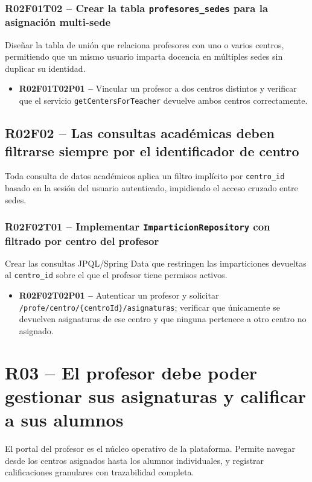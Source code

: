 \documentclass[12pt, a4paper]{report}
\begin{document}
\subsubsection{R02F01T02 -- Crear la tabla \texttt{profesores\_sedes} para la asignación multi-sede}
Diseñar la tabla de unión que relaciona profesores con uno o varios centros, permitiendo que un mismo usuario imparta docencia en múltiples sedes sin duplicar su identidad.
\begin{itemize}
  \item \textbf{R02F01T02P01 --} Vincular un profesor a dos centros distintos y verificar que el servicio \texttt{getCentersForTeacher} devuelve ambos centros correctamente.
\end{itemize}

\subsection{R02F02 -- Las consultas académicas deben filtrarse siempre por el identificador de centro}

Toda consulta de datos académicos aplica un filtro implícito por \texttt{centro\_id} basado en la sesión del usuario autenticado, impidiendo el acceso cruzado entre sedes.

\subsubsection{R02F02T01 -- Implementar \texttt{ImparticionRepository} con filtrado por centro del profesor}
Crear las consultas JPQL/Spring Data que restringen las imparticiones devueltas al \texttt{centro\_id} sobre el que el profesor tiene permisos activos.
\begin{itemize}
  \item \textbf{R02F02T02P01 --} Autenticar un profesor y solicitar \texttt{/profe/centro/\{centroId\}/asignaturas}; verificar que únicamente se devuelven asignaturas de ese centro y que ninguna pertenece a otro centro no asignado.
\end{itemize}

\section{R03 -- El profesor debe poder gestionar sus asignaturas y calificar a sus alumnos}

El portal del profesor es el núcleo operativo de la plataforma. Permite navegar desde los centros asignados hasta los alumnos individuales, y registrar calificaciones granulares con trazabilidad completa.
\end{document}
